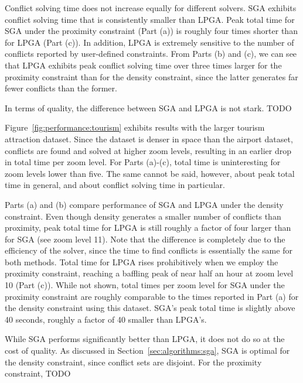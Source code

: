 Conflict solving time does not increase equally for different solvers. SGA exhibits conflict solving time that is consistently smaller than LPGA. Peak total time for SGA under the proximity constraint (Part (a)) is roughly four times shorter than for LPGA (Part (c)). In addition, LPGA is extremely sensitive to the number of conflicts reported by user-defined constraints. From Parts (b) and (c), we can see that LPGA exhibits peak conflict solving time over three times larger for the proximity constraint than for the density constraint, since the latter generates far fewer conflicts than the former. 


In terms of quality, the difference between SGA and LPGA is not stark. TODO


Figure~\ref{fig:performance:tourism} exhibits results with the larger tourism attraction dataset. Since the dataset is denser in space than the airport dataset, conflicts are found and solved at higher zoom levels, resulting in an earlier drop in total time per zoom level. For Parts (a)-(c), total time is uninteresting for zoom levels lower than five. The same cannot be said, however, about peak total time in general, and about conflict solving time in particular.

Parts (a) and (b) compare performance of SGA and LPGA under the density constraint. Even though density generates a smaller number of conflicts than proximity, peak total time for LPGA is still roughly a factor of four larger than for SGA (see zoom level 11). Note that the difference is completely due to the efficiency of the solver, since the time to find conflicts is essentially the same for both methods. Total time for LPGA rises prohibitively when we employ the proximity constraint, reaching a baffling peak of near half an hour at zoom level 10 (Part (c)). While not shown, total times per zoom level for SGA under the proximity constraint are roughly comparable to the times reported in Part (a) for the density constraint using this dataset. SGA's peak total time is slightly above 40 seconds, roughly a factor of 40 smaller than LPGA's.         

While SGA performs significantly better than LPGA, it does not do so at the cost of quality. As discussed in Section~\ref{sec:algorithms:sga}, SGA is optimal for the density constraint, since conflict sets are disjoint. For the proximity constraint, TODO

